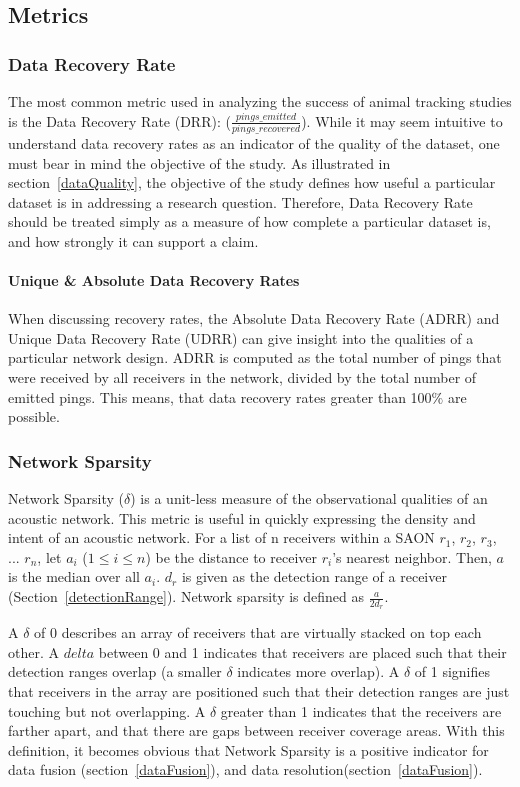 \subsection{Metrics}
\subsubsection{Data Recovery Rate}
\label{dataRecoveryRate}
The most common metric used in analyzing the success of animal tracking studies is the Data Recovery Rate (DRR): ($\frac{pings\_emitted}{pings\_recovered}$).  While it may seem intuitive to understand data recovery rates as an indicator of the quality of the dataset, one must bear in mind the objective of the study.  As illustrated in section~\ref{dataQuality}, the objective of the study defines how useful a particular dataset is in addressing a research question.  Therefore, Data Recovery Rate should be treated simply as a measure of how complete a particular dataset is, and how strongly it can support a claim.  

\paragraph{Unique \& Absolute Data Recovery Rates}
When discussing recovery rates, the Absolute Data Recovery Rate (ADRR) and Unique Data Recovery Rate (UDRR) can give insight into the qualities of a particular network design.  ADRR is computed as the total number of pings that were received by all receivers in the network, divided by the total number of emitted pings.  This means, that data recovery rates greater than 100$\%$ are possible.  

\subsubsection{Network Sparsity}
\label{delta}
Network Sparsity ($\delta$) is a unit-less measure of the observational qualities of an acoustic network.  This metric is useful in quickly expressing the density and intent of an acoustic network.  For a list of n receivers within a SAON $r_1$, $r_2$, $r_3$, ... $r_n$, let $a_i$ ($1\le i \le n$) be the distance to receiver $r_i$'s nearest neighbor.  Then, $a$ is the median over all $a_i$.  $d_r$ is given as the detection range of a receiver (Section~\ref{detectionRange}).  Network sparsity is defined as $\frac{a}{2d_r}$. \cite{EstimatingIndividual}

A $\delta$ of 0 describes an array of receivers that are virtually stacked on top each other.  A $delta$ between 0 and 1 indicates that receivers are placed such that their detection ranges overlap (a smaller $\delta$ indicates more overlap).  A $\delta$ of 1 signifies that receivers in the array are positioned such that their detection ranges are just touching but not overlapping.  A $\delta$ greater than 1 indicates that the receivers are farther apart, and that there are gaps between receiver coverage areas. \cite{EstimatingIndividual}  With this definition, it becomes obvious that Network Sparsity is a positive indicator for data fusion (section~\ref{dataFusion}), and data resolution(section~\ref{dataFusion}).


